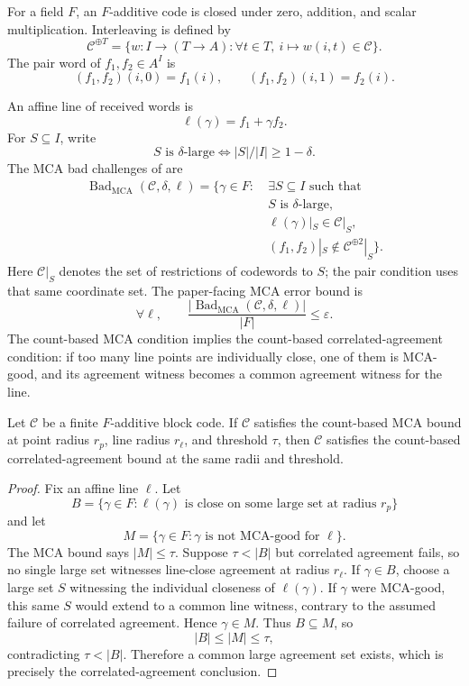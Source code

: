 For a field \(F\), an \(F\)-additive code is closed under zero, addition, and
scalar multiplication. Interleaving is defined by
\[
  \mathcal C^{\oplus T}
  =
  \{w:I\to(T\to A):\forall t\in T,\ i\mapsto w(i,t)\in \mathcal C\}.
\]
The pair word of \(f_1,f_2\in A^I\) is
\[
  (f_1,f_2)(i,0)=f_1(i),\qquad
  (f_1,f_2)(i,1)=f_2(i).
\]

An affine line of received words is
\[
  \ell(\gamma)=f_1+\gamma f_2.
\]
For \(S\subseteq I\), write
\[
  S\text{ is }\delta\text{-large}
  \Longleftrightarrow
  |S|/|I|\ge 1-\delta.
\]
The MCA bad challenges of \cite[Definition~4.3]{proximityPrize2026} are
\[
\begin{aligned}
  \operatorname{Bad}_{\mathrm{MCA}}(\mathcal C,\delta,\ell)
  =
  \{\gamma\in F:\ &\exists S\subseteq I\text{ such that}\\
  &S\text{ is }\delta\text{-large},\\
  &\ell(\gamma)|_S\in\mathcal C|_S,\\
  &(f_1,f_2)|_S\notin\mathcal C^{\oplus 2}|_S\}.
\end{aligned}
\]
Here \(\mathcal C|_S\) denotes the set of restrictions of codewords to
\(S\); the pair condition uses that same coordinate set.
The paper-facing MCA error bound is
\[
  \forall \ell,\qquad
  \frac{|\operatorname{Bad}_{\mathrm{MCA}}(\mathcal C,\delta,\ell)|}{|F|}
  \le \varepsilon.
\]
The count-based MCA condition implies the count-based correlated-agreement
condition: if too many line points are individually close, one of them is
MCA-good, and its agreement witness becomes a common agreement witness for the
line.

\begin{proposition}\label{prop:mca-implies-ca}
Let \(\mathcal C\) be a finite \(F\)-additive block code. If \(\mathcal C\)
satisfies the count-based MCA bound at point radius \(r_p\), line radius
\(r_\ell\), and threshold \(\tau\), then \(\mathcal C\) satisfies the
count-based correlated-agreement bound at the same radii and threshold.
\end{proposition}

\begin{proof}
Fix an affine line \(\ell\). Let
\[
  B=\{\gamma\in F:\ell(\gamma)\text{ is close on some large set at radius }r_p\}
\]
and let
\[
  M=\{\gamma\in F:\gamma\text{ is not MCA-good for }\ell\}.
\]
The MCA bound says \(|M|\le\tau\). Suppose \(\tau<|B|\) but correlated
agreement fails, so no single large set witnesses line-close agreement at
radius \(r_\ell\). If \(\gamma\in B\), choose a large set \(S\) witnessing the
individual closeness of \(\ell(\gamma)\). If \(\gamma\) were MCA-good, this same
\(S\) would extend to a common line witness, contrary to the assumed failure of
correlated agreement. Hence \(\gamma\in M\). Thus \(B\subseteq M\), so
\[
  |B|\le |M|\le \tau,
\]
contradicting \(\tau<|B|\). Therefore a common large agreement set exists, which
is precisely the correlated-agreement conclusion.
\end{proof}

